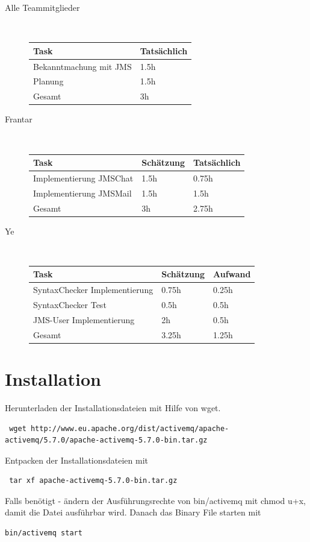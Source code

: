 \documentclass[11pt, a4paper]{article}
\begin{document}
\begin{description}
\item[Alle Teammitglieder] \hfill \\
  \begin{tabular} {| l | l |}
    \hline
    Task & Tatsächlich \\ \hline
    Bekanntmachung mit JMS & 1.5h \\ \hline
    Planung & 1.5h \\ \hline
    \hline
    Gesamt & 3h \\ \hline
  \end{tabular}

\item[Frantar] \hfill \\

  \begin{tabular} {| l | l | l |}
    \hline
    Task & Schätzung & Tatsächlich \\ \hline
    Implementierung JMSChat & 1.5h & 0.75h \\ \hline
    Implementierung JMSMail & 1.5h & 1.5h \\ \hline
    \hline
    Gesamt & 3h & 2.75h \\ \hline
  \end{tabular}

\item[Ye] \hfill \\
    \begin{tabular} {| l | l | l |}
      \hline
      Task & Schätzung & Aufwand \\ \hline
      SyntaxChecker Implementierung & 0.75h & 0.25h \\ \hline
      SyntaxChecker Test & 0.5h & 0.5h \\ \hline
      JMS-User Implementierung & 2h & 0.5h \\ \hline
      \hline
      Gesamt & 3.25h & 1.25h \\ \hline
    \end{tabular}
\end{description}

\section{Installation}
Herunterladen der Installationsdateien mit Hilfe von wget.
\begin{lstlisting}
 wget http://www.eu.apache.org/dist/activemq/apache-activemq/5.7.0/apache-activemq-5.7.0-bin.tar.gz
\end{lstlisting}
Entpacken der Installationsdateien mit
\begin{lstlisting}
 tar xf apache-activemq-5.7.0-bin.tar.gz
\end{lstlisting}
Falls benötigt - ändern der Ausführungsrechte von bin/activemq mit chmod u+x, damit die Datei ausführbar wird.
Danach das Binary File starten mit
\begin{lstlisting}
bin/activemq start
\end{lstlisting}
\end{document}
